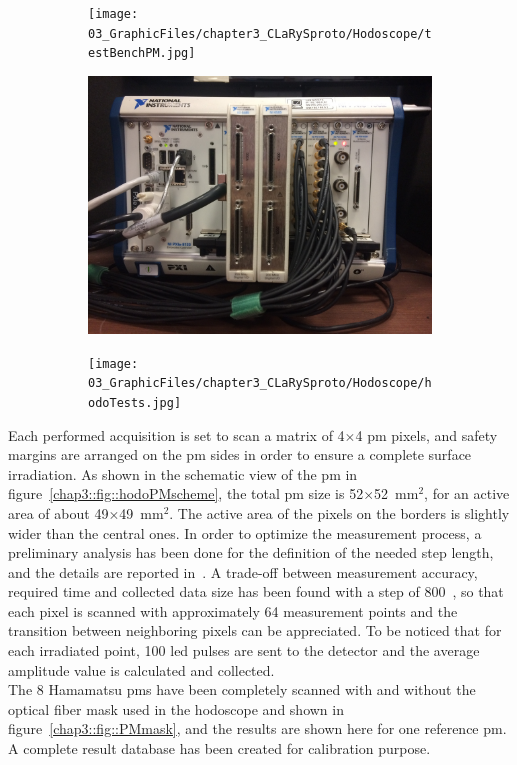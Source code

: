 \begin{figure}
\begin{subfigure}[t]{1\textwidth}
\centering
\texttt{[image: 03\_GraphicFiles/chapter3\_CLaRySproto/Hodoscope/testBenchPM.jpg]}
\caption{}
\label{chap3::fig::hodo_testBenchPM}
\end{subfigure}
\newline
\begin{subfigure}[t]{.5\textwidth}
\centering
\includegraphics[width=1\textwidth, height = 5.cm]{03_GraphicFiles/chapter3_CLaRySproto/Electronics_Acquisition/PXI_ipnl.jpg}
\caption{}
\label{chap3::fig::PXI_NI}
\end{subfigure}
\begin{subfigure}[t]{.5\textwidth}
\centering
\texttt{[image: 03\_GraphicFiles/chapter3\_CLaRySproto/Hodoscope/hodoTests.jpg]}
\caption{}
\label{chap3::fig::hodo_LabView}
\end{subfigure}
\caption{}
\label{chap3::fig::hodoPMtest}
\end{figure}

Each performed acquisition is set to scan a matrix of 4$\times$4 \gls{pm} pixels, and safety margins are arranged on the \gls{pm} sides in order to ensure a complete surface irradiation. As shown in the schematic view of the \gls{pm} in figure~\ref{chap3::fig::hodoPMscheme}, the total \gls{pm} size is 52$\times$52~mm$^{2}$, for an active area of about 49$\times$49~mm$^{2}$. The active area of the pixels on the borders is slightly wider than the central ones. In order to optimize the measurement process, a preliminary analysis has been done for the definition of the needed step length, and the details are reported in~\cite{Coudurier2015}. A trade-off between measurement accuracy, required time and collected data size has been found with a step of 800~\charmum, so that each pixel is scanned with approximately 64 measurement points and the transition between neighboring pixels can be appreciated. To be noticed that for each irradiated point, 100 \gls{led} pulses are sent to the detector and the average amplitude value is  calculated and collected.\\  
The 8 Hamamatsu \glspl{pm} have been completely scanned with and without the optical fiber mask used in the hodoscope and shown in figure~\ref{chap3::fig::PMmask}, and the results are shown here for one reference \gls{pm}. A complete result database has been created for calibration purpose.\\

